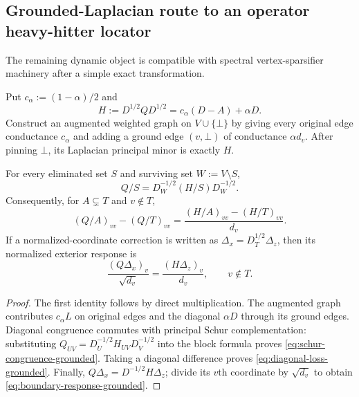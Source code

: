 \subsection{Grounded-Laplacian route to an operator heavy-hitter locator}
\label{sec:grounded-laplacian-locator}

The remaining dynamic object is compatible with spectral vertex-sparsifier
machinery after a simple exact transformation.

\begin{proposition}
\label{prop:grounded-laplacian-representation}
Put $c_\alpha:=(1-\alpha)/2$ and
\begin{equation}
 H:=D^{1/2}QD^{1/2}=c_\alpha(D-A)+\alpha D.
 \label{eq:grounded-pagerank-matrix}
\end{equation}
Construct an augmented weighted graph on $V\cup\{\bot\}$ by giving every
original edge conductance $c_\alpha$ and adding a ground edge
$(v,\bot)$ of conductance $\alpha d_v$.  After pinning $\bot$, its Laplacian
principal minor is exactly $H$.

For every eliminated set $S$ and surviving set $W:=V\setminus S$,
\begin{equation}
 Q/S=D_W^{-1/2}(H/S)D_W^{-1/2}.
 \label{eq:schur-congruence-grounded}
\end{equation}
Consequently, for $A\subsetneq T$ and $v\notin T$,
\begin{equation}
 (Q/A)_{vv}-(Q/T)_{vv}
 =\frac{(H/A)_{vv}-(H/T)_{vv}}{d_v}.
 \label{eq:diagonal-loss-grounded}
\end{equation}
If a normalized-coordinate correction is written as
$\Delta_x=D_T^{1/2}\Delta_z$, then its normalized exterior response is
\begin{equation}
 \frac{(Q\Delta_x)_v}{\sqrt{d_v}}
 =\frac{(H\Delta_z)_v}{d_v},
 \qquad v\notin T.
 \label{eq:boundary-response-grounded}
\end{equation}
\end{proposition}

\begin{proof}
The first identity follows by direct multiplication.  The augmented graph
contributes $c_\alpha L$ on original edges and the diagonal
$\alpha D$ through its ground edges.  Diagonal congruence commutes with
principal Schur complementation: substituting
$Q_{UV}=D_U^{-1/2}H_{UV}D_V^{-1/2}$ into the block formula proves
\cref{eq:schur-congruence-grounded}.  Taking a diagonal difference proves
\cref{eq:diagonal-loss-grounded}.  Finally,
$Q\Delta_x=D^{-1/2}H\Delta_z$; divide its $v$th coordinate by
$\sqrt{d_v}$ to obtain \cref{eq:boundary-response-grounded}.
\end{proof}

